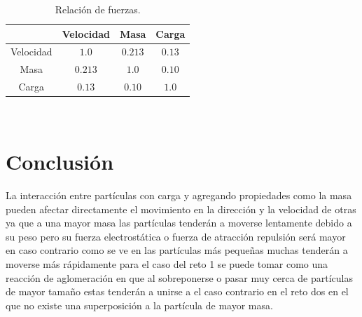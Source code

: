 \documentclass[10pt,a4paper]{article}
\newcommand{\celda}[1]{
	\begin{minipage}{2cm}
		\vspace{2mm}
		#1
		\vspace{2mm}
	\end{minipage}
}
\begin{document}
	\begin{table}[H]
		\centering
		\caption{Relación de fuerzas.}
		\begin{tabular}{cccc}
			\hline
			\celda{} & \celda{Velocidad} & \celda{Masa} & \celda{Carga}\\
			\hline
			\celda{Velocidad} & \celda{$1.0$} & \celda{$0.213$} & \celda{$0.13$}\\
			\hline
			\celda{Masa} & \celda{$0.213$} & \celda{$1.0$} & \celda{$0.10$}\\
			\hline
			\celda{Carga} & \celda{$0.13$} & \celda{$0.10$} & \celda{$1.0$}\\
			\hline
		\end{tabular}
		\label{tb: Tabla2}
	\end{table}
	\vspace{5mm}
	\begin{multicols}
\\	\section{Conclusión}
	
La interacción entre partículas con carga y agregando propiedades como la masa pueden afectar directamente el movimiento en la dirección y la velocidad de otras ya que a una mayor masa las partículas tenderán a moverse lentamente debido a su peso pero su fuerza electrostática o fuerza de atracción repulsión será mayor en caso contrario como se ve en las partículas más pequeñas muchas tenderán a moverse más rápidamente para el caso del reto 1 se puede tomar como una reacción de aglomeración en que al sobreponerse o pasar muy cerca de partículas de mayor tamaño estas tenderán a unirse a el caso contrario en el reto dos en el que no existe una superposición a la partícula de mayor masa.


	\end{multicols}

	
\end{document}
